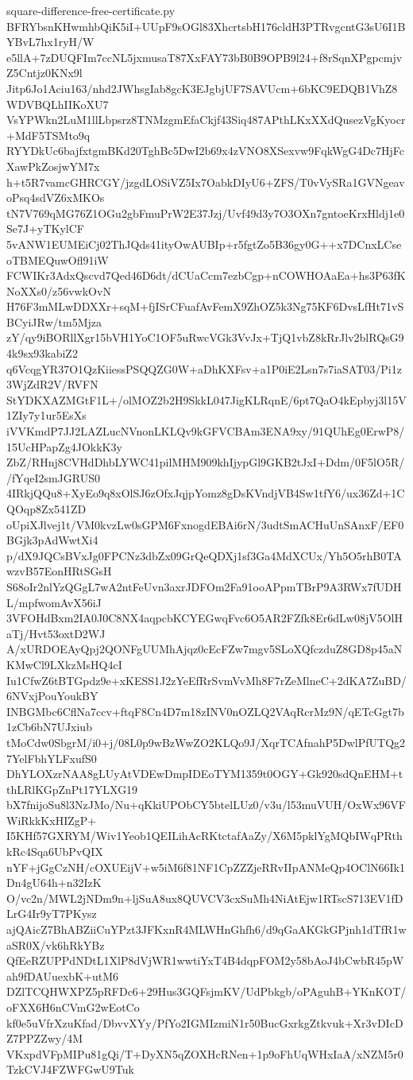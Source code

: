 \documentclass[11pt]{article}
\theoremstyle{definition}
\theoremstyle{remark}
\begin{document}
\begin{filecontents*}[overwrite]{square-difference-free-certificate.py}
BFRYbsnKHwmhbQiK5iI+UUpF9sOGl83XhcrtsbH176cldH3PTRvgcntG3sU6I1BYBvL7hx1ryH/W
e5llA+7zDUQFIm7ccNL5jxmusaT87XxFAY73bB0B9OPB9l24+f8rSqnXPgpcmjvZ5Cntjz0KNx9l
Jitp6Jo1Aciu163/nhd2JWhsgIab8gcK3EJgbjUF7SAVUcm+6bKC9EDQB1VhZ8WDVBQLhIIKoXU7
VsYPWkn2LuM1llLbpsrz8TNMzgmEfaCkjf43Siq487APthLKxXXdQusezVgKyocr+MdF5TSMto9q
RYYDkUc6bajfxtgmBKd20TghBc5DwI2b69x4zVNO8XSexvw9FqkWgG4Dc7HjFcXawPkZosjwYM7x
h+t5R7vamcGHRCGY/jzgdLOSiVZ5Ix7OabkDIyU6+ZFS/T0vVySRa1GVNgeavoPsq4sdVZ6xMKOs
tN7V769qMG76Z1OGu2gbFmuPrW2E37Jzj/Uvf49d3y7O3OXn7gntoeKrxHldj1e0Se7J+yTKylCF
5vANW1EUMEiCj02ThJQds41ityOwAUBIp+r5fgtZo5B36gy0G++x7DCnxLCseoTBMEQuwOfl91iW
FCWIKr3AdxQscvd7Qed46D6dt/dCUaCcm7ezbCgp+nCOWHOAaEa+hs3P63fKNoXXs0/z56vwkOvN
H76F3mMLwDDXXr+sqM+fjISrCFuafAvFemX9ZhOZ5k3Ng75KF6DvsLfHt71vSBCyiJRw/tm5Mjza
zY/qy9iBORllXgr15bVH1YoC1OF5uRwcVGk3VvJx+TjQ1vbZ8kRrJlv2blRQsG94k9sx93kabiZ2
q6VcqgYR37O1QzKiiessPSQQZG0W+aDhKXFsv+a1P0iE2Lsn7s7iaSAT03/Pi1z3WjZdR2V/RVFN
StYDKXAZMGtF1L+/olMOZ2b2H9SkkL047JigKLRqnE/6pt7QaO4kEpbyj3l15V1ZIy7y1ur5EsXs
iVVKmdP7JJ2LAZLucNVnonLKLQv9kGFVCBAm3ENA9xy/91QUhEg0ErwP8/15UcHPapZg4JOkkK3y
ZbZ/RHnj8CVHdDhbLYWC41pilMHM909khIjypGl9GKB2tJxI+Ddm/0F5lO5R//fYqeI2smJGRUS0
4IRkjQQu8+XyEo9q8xOlSJ6zOfxJqjpYomz8gDsKVndjVB4Sw1tfY6/ux36Zd+1CQOqp8Zx541ZD
oUpiXJlvej1t/VM0kvzLw0sGPM6FxnogdEBAi6rN/3udtSmACHuUnSAnxF/EF0BGjk3pAdWwtXi4
p/dX9JQCsBVxJg0FPCNz3dbZx09GrQeQDXj1sf3Ga4MdXCUx/Yh5O5rhB0TAwzvB57EonHRtSGsH
S68oIr2nlYzQGgL7wA2ntFeUvn3axrJDFOm2Fa91ooAPpmTBrP9A3RWx7fUDHL/mpfwomAvX56iJ
3VFOHdBxm2IA0J0C8NX4aqpcbKCYEGwqFvc6O5AR2FZfk8Er6dLw08jV5OlHaTj/Hvt53oxtD2WJ
A/xURDOEAyQpj2QONFgUUMhAjqz0cEcFZw7mgv5SLoXQfczduZ8GD8p45aNKMwCl9LXkzMsHQ4cI
Iu1CfwZ6tBTGpdz9e+xKESS1J2zYeEfRrSvmVvMh8F7rZeMlneC+2dKA7ZuBD/6NVxjPouYoukBY
INBGMbc6CflNa7ccv+ftqF8Cn4D7m18zINV0nOZLQ2VAqRcrMz9N/qETcGgt7b1zCb6bN7UJxiub
tMoCdw0SbgrM/i0+j/08L0p9wBzWwZO2KLQo9J/XqrTCAfnahP5DwlPfUTQg27YelFbhYLFxufS0
DhYLOXzrNAA8gLUyAtVDEwDmpIDEoTYM1359t0OGY+Gk920sdQnEHM+tthLRlKGpZnPt17YLXG19
bX7fnijoSu8l3NzJMo/Nu+qKkiUPObCY5btelLUz0/v3u/l53muVUH/OxWx96VFWiRkkKxHIZgP+
I5KHf57GXRYM/Wiv1Yeob1QEILihAcRKtctafAaZy/X6M5pklYgMQbIWqPRthkRc4Sqa6UbPvQIX
nYF+jGgCzNH/cOXUEijV+w5iM6f81NF1CpZZZjeRRvIIpANMeQp4OClN66Ik1Dn4gU64h+n32IzK
O/vc2n/MWL2jNDm9n+ljSuA8ux8QUVCV3cxSuMh4NiAtEjw1RTscS713EV1fDLrG4Ir9yT7PKysz
ajQAicZ7BhABZiiCuYPzt3JFKxnR4MLWHnGhfh6/d9qGaAKGkGPjnh1dTfR1waSR0X/vk6hRkYBz
QfEeRZUPPdNDtL1XlP8dVjWR1wwtiYxT4B4dqpFOM2y58bAoJ4bCwbR45pWah9fDAUuexbK+utM6
DZlTCQHWXPZ5pRFDc6+29Hus3GQFsjmKV/UdPbkgb/oPAguhB+YKnKOT/oFXX6H6nCVmG2wEotCo
kf0e5uVfrXzuKfad/DbvvXYy/PfYo2IGMIzmiN1r50BucGxrkgZtkvuk+Xr3vDIcDZ7PPZZwy/4M
VKxpdVFpMIPu81gQi/T+DyXN5qZOXHcRNen+1p9oFhUqWHxIaA/xNZM5r0TzkCVJ4FZWFGwU9Tuk

\end{filecontents*}
\end{document}
